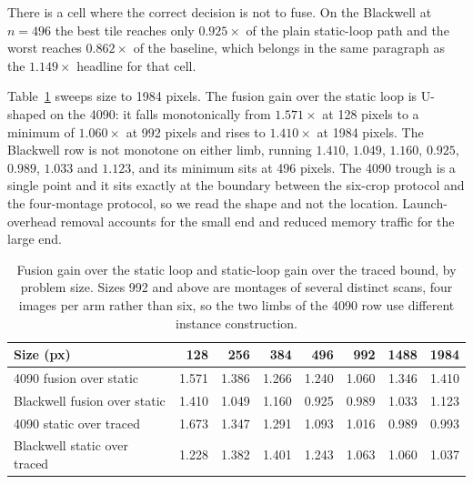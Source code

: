 There is a cell where the correct decision is not to fuse. On the Blackwell at
$n=496$ the best tile reaches only $0.925\times$ of the plain static-loop path
and the worst reaches $0.862\times$ of the baseline, which belongs in the same
paragraph as the $1.149\times$ headline for that cell.

Table~\ref{tab:ushape} sweeps size to 1984 pixels. The fusion gain over the
static loop is U-shaped on the 4090: it falls monotonically from $1.571\times$
at 128 pixels to a minimum of $1.060\times$ at 992 pixels and rises to
$1.410\times$ at 1984 pixels. The Blackwell row is not monotone on either limb,
running $1.410$, $1.049$, $1.160$, $0.925$, $0.989$, $1.033$ and $1.123$, and
its minimum sits at 496 pixels. The 4090 trough is a single point and it sits
exactly at the boundary between the six-crop protocol and the four-montage
protocol, so we read the shape and not the location. Launch-overhead removal
accounts for the small end and reduced memory traffic for the large end.

\begin{table}[t]
\centering
\caption{Fusion gain over the static loop and static-loop gain over the traced
bound, by problem size. Sizes 992 and above are montages of several distinct
scans, four images per arm rather than six, so the two limbs of the 4090 row
use different instance construction.}
\label{tab:ushape}
\begin{tabular}{@{}lrrrrrrr@{}}
\toprule
Size (px) & 128 & 256 & 384 & 496 & 992 & 1488 & 1984 \\
\midrule
4090 fusion over static      & 1.571 & 1.386 & 1.266 & 1.240 & 1.060 & 1.346 & 1.410 \\
Blackwell fusion over static & 1.410 & 1.049 & 1.160 & 0.925 & 0.989 & 1.033 & 1.123 \\
4090 static over traced      & 1.673 & 1.347 & 1.291 & 1.093 & 1.016 & 0.989 & 0.993 \\
Blackwell static over traced & 1.228 & 1.382 & 1.401 & 1.243 & 1.063 & 1.060 & 1.037 \\
\bottomrule
\end{tabular}
\end{table}

